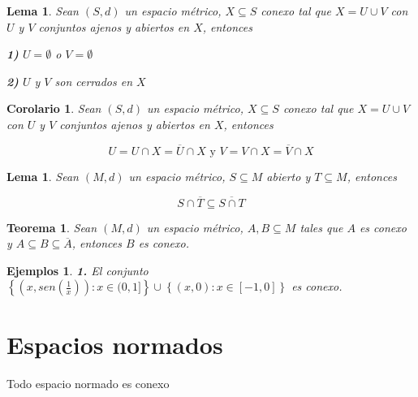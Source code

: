 \documentclass[oneside]{book} %
\theoremstyle{Teorema}
\newtheorem{Teorema}[Definicion]{Teorema}
\newtheorem{Corolario}[Definicion]{Corolario}
\newtheorem{Lema}[Definicion]{Lema}
\theoremstyle{Ejemplos}
\newtheorem{Ejemplos}[Definicion]{Ejemplos}
\theoremstyle{[Obs]}
\renewcommand{\{}{\left\lbrace} %
\renewcommand{\}}{\right\rbrace} %
\renewcommand{\u}{\cup} %
\newcommand{\n}{\cap} %
\renewcommand{\sc}{\subseteq} %
\begin{document}
			\begin{Lema}\setlength{\parindent}{0em}
				
				Sean $(S, d)$ un espacio métrico, $X \sc S$ conexo tal que $X = U \u V$ con $U$ y $V$ conjuntos ajenos y abiertos en $X$, entonces 

				\textbf{1)} $U = \emptyset$ o $V = \emptyset$ 

				\textbf{2)} $U$ y $V$ son cerrados en $X$ 

			\end{Lema}

			\begin{Corolario}\setlength{\parindent}{0em}
				
				Sean $(S, d)$ un espacio métrico, $X \sc S$ conexo tal que $X = U \u V$ con $U$ y $V$ conjuntos ajenos y abiertos en $X$, entonces 
				
				\[ U = U \n X = \overline{U} \n X \text{ y } V = V \n X = \overline{V} \n X \] 

			\end{Corolario}

			\begin{Lema}\setlength{\parindent}{0em}
				
				Sean $(M, d)$ un espacio métrico, $S \sc M$ abierto y $T \sc M$, entonces 

				\[ S \n \overline{T} \sc \overline{S \n T} \] 

			\end{Lema}

			\begin{Teorema}\setlength{\parindent}{0em}
				
				Sean $(M, d)$ un espacio métrico, $A, B \sc M$ tales que $A$ es conexo y $A \sc B \sc \overline{A}$, entonces $B$ es conexo. 

			\end{Teorema}

			\begin{Ejemplos}\setlength{\parindent}{0em}
				
				\textbf{1.} El conjunto $\{ (x, sen(\frac{1}{x})) : x \in (0, 1] \} \u \{ (x, 0) : x \in [-1, 0] \}$ es conexo. 

			\end{Ejemplos}

	\chapter{Espacios normados}

		Todo espacio normado es conexo 
\end{document}
